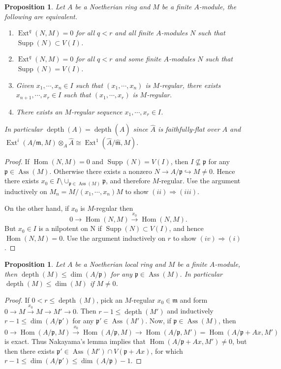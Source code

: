 \documentclass[leqno]{amsart}
\DeclareMathOperator{\Supp}{Supp}
\DeclareMathOperator{\Ass}{Ass}
\DeclareMathOperator{\depth}{depth}
\newcommand{\1}{\mathbf{1}}
\newcommand{\fm}{\mathfrak m}
\newcommand{\fp}{\mathfrak p}
\DeclareMathOperator{\Ext}{Ext}
\DeclareMathOperator{\Hom}{Hom}
\newtheorem{prop}[thm]{Proposition}
\theoremstyle{definition}
\theoremstyle{remark}
\begin{document}
\begin{prop}
	Let $A$ be a Noetherian ring and $M$ be a finite $A$-module, the following are equivalent.
	\begin{enumerate}
	\item 
	$\Ext^q(N,M)=0$ for all $q<r$ and all 
	finite $A$-modules $N$ such that $\Supp(N)\subset V(I)$.
	\item 
	$\Ext^q(N,M)=0$ for all $q<r$ and some 
	finite $A$-modules $N$ such that $\Supp(N)=V(I)$.
	\item 
	Given $x_1,\cdots,x_n\in I$ such that
	$(x_1,\cdots,x_n)$ is $M$-regular,
	there exists $x_{n+1},\cdots,x_r\in I$ such that 
	$(x_1,\cdots,x_r)$ is $M$-regular.
	\item 
	There exists an $M$-regular sequence $x_1,\cdots,x_r\in I$.
	\end{enumerate}
	In particular
	$\depth(A)=\depth(\hat{A})$
	since $\hat{A}$ is faithfully-flat over $A$
	and $\Ext^i(A/\fm, M)\otimes_A\hat{A}\cong
	\Ext^1(\hat{A}/\hat{\fm}, \hat{M})$.
\end{prop}
\begin{proof}
	If $\Hom(N,M)=0$ and $\Supp(N)=V(I)$,
	then $I\nsubseteq \fp$ for any  $\fp\in \Ass(M)$.
	Otherwise there exists a nonzero
	$N\to A/\fp\hookrightarrow M\neq 0$.
	Hence there exists $x_0\in I\setminus \cup_{\fp\in\Ass(M)}\fp$,
	and therefore $M$-regular.
	Use the argument inductively on 
	$M_n=M/(x_1,\cdots,x_n)M$ 
	to show $(ii)\Longrightarrow(iii)$.

	On the other hand, if $x_0$ is  $M$-regular then
	\[
		0\to \Hom(N,M)\xrightarrow{x_0}\Hom(N,M).
	\]
	But $x_0\in I$ is a nilpotent on N 
	if $\Supp(N)\subset V(I)$, and hence $\Hom(N,M)=0$.
	Use the argument inductively on $r$
	to show  $(iv)\Longrightarrow (i)$. 
\end{proof}

\begin{prop}
	Let $A$ be a Noetherian local ring and 
	$M$ be a finite $A$-module, 
	then $\depth(M)\leq \dim(A/\fp)$ for any  $\fp\in \Ass(M)$. 
	In particular  $\depth(M)\leq \dim(M)$ if  $M\neq 0$.
\end{prop}
\begin{proof}
	If $0<r\leq \depth(M)$, pick an  $M$-regular $x_0\in \fm$
	and form $0\to M\xrightarrow{x_0}M\to M'\to 0$.
	Then $r-1\leq \depth(M')$ and inductively
	$r-1\leq \dim(A/\fp')$ for any  $\fp'\in \Ass(M')$.
	Now, if  $\fp\in \Ass(M)$, then 
	 \[
		 0\to \Hom(A/\fp,M)\xrightarrow{x_0}
		 \Hom(A/\fp,M) \to 
		 \Hom(A/\fp,M')=\Hom(A/\fp+Ax, M')
	\]
	is exact. Thus Nakayama's lemma implies that 
	$\Hom(A/\fp+Ax,M')\neq 0$,
	but then there exists  $\fp'\in \Ass(M')\cap V(\fp+Ax)$,
	for which $r-1\leq \dim(A/\fp')\leq \dim(A/\fp)-1$. 
\end{proof}
\end{document}

